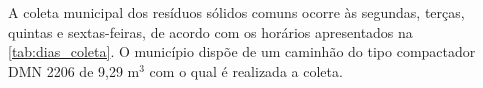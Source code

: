 A coleta municipal dos resíduos sólidos comuns ocorre às segundas, terças, quintas e sextas-feiras, de acordo com os horários apresentados na \autoref{tab:dias_coleta}.  O município dispõe de um caminhão do tipo compactador DMN 2206 de 9,29 m$^{3}$ com o qual é realizada a coleta.

